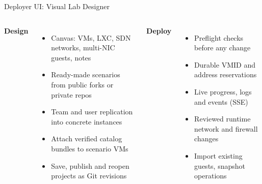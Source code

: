 \documentclass[aspectratio=169]{beamer}
\begin{document}
\begin{frame}{Deployer UI: Visual Lab Designer \; \faDrawPolygon}
  \begin{columns}[T]
    \textbf{\faEdit\; Design}
    \begin{itemize}
      \item Canvas: VMs, LXC, SDN networks, multi-NIC guests, notes
      \item Ready-made scenarios from public forks or private repos
      \item Team and user replication into concrete instances
      \item Attach verified catalog bundles to scenario VMs
      \item Save, publish and reopen projects as Git revisions
    \end{itemize}

    \textbf{\faPlay\; Deploy}
    \begin{itemize}
      \item Preflight checks before any change
      \item Durable VMID and address reservations
      \item Live progress, logs and events (SSE)
      \item Reviewed runtime network and firewall changes
      \item Import existing guests, snapshot operations
    \end{itemize}
  \end{columns}
\end{frame}
\end{document}
